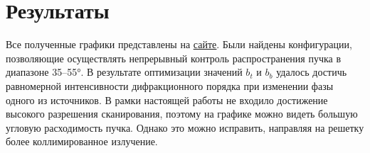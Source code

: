 \section{Результаты}

Все полученные графики представлены на \href{https://fizfakovets.github.io}{\underline{сайте}}. Были найдены конфигурации, позволяющие осуществлять непрерывный контроль распространения пучка в диапазоне 35--55°. В результате оптимизации значений $b_t$ и $b_b$ удалось достичь равномерной интенсивности дифракционного порядка при изменении фазы одного из источников. В рамки настоящей работы не входило достижение высокого разрешения сканирования, поэтому на графике можно видеть большую угловую расходимость пучка. Однако это можно исправить, направляя на решетку более коллимированное излучение.
